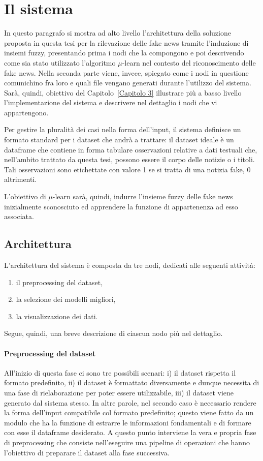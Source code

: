 \documentclass[12pt]{report}
\theoremstyle{definition}
\begin{document}
\section{Il sistema}
\label{sistema}
In questo paragrafo si mostra ad alto livello l'architettura della soluzione proposta in questa tesi per la rilevazione delle fake news tramite l'induzione di insiemi fuzzy, presentando prima i nodi che la compongono e poi descrivendo come sia stato utilizzato l'algoritmo $\mu$-learn nel contesto del riconoscimento delle fake news.
Nella seconda parte viene, invece, spiegato come i nodi in questione comunichino fra loro e quali file vengano generati durante l'utilizzo del sistema. Sarà, quindi, obiettivo del Capitolo~\ref{Capitolo 3} illustrare più a basso livello l'implementazione del sistema e descrivere nel dettaglio i nodi che vi appartengono.

Per gestire la pluralità dei casi nella forma dell'input, il sistema definisce un formato standard per i dataset che andrà a trattare: il dataset ideale è un dataframe che contiene in forma tabulare osservazioni relative a dati testuali che, nell'ambito trattato da questa tesi, possono essere il corpo delle notizie o i titoli.
Tali osservazioni sono etichettate con valore 1 se si tratta di una notizia fake, 0 altrimenti.

L'obiettivo di $\mu$-learn sarà, quindi, indurre l'insieme fuzzy delle fake news inizialmente sconosciuto ed apprendere la funzione di appartenenza ad esso associata.
\subsection{Architettura}\label{architecture}
L'architettura del sistema è composta da tre nodi, dedicati alle seguenti attività: 
\begin{enumerate}
    \item il preprocessing del dataset,
    \item la selezione dei modelli migliori,
    \item la visualizzazione dei dati.
\end{enumerate}
Segue, quindi, una breve descrizione di ciascun nodo più nel dettaglio.

\paragraph{Preprocessing del dataset} All'inizio di questa fase ci sono tre possibili scenari: i) il dataset rispetta il formato predefinito, ii) il dataset è formattato diversamente e dunque necessita di una fase di rielaborazione per poter essere utilizzabile, iii) il dataset viene generato dal sistema stesso.
In altre parole, nel secondo caso è necessario rendere la forma dell'input compatibile col formato predefinito; questo viene fatto da un modulo che ha la funzione di estrarre le informazioni fondamentali e di formare con esse il dataframe desiderato.
A questo punto interviene la vera e propria fase di preprocessing che consiste nell'eseguire una pipeline di operazioni che hanno l'obiettivo di preparare il dataset alla fase successiva.
\end{document}
